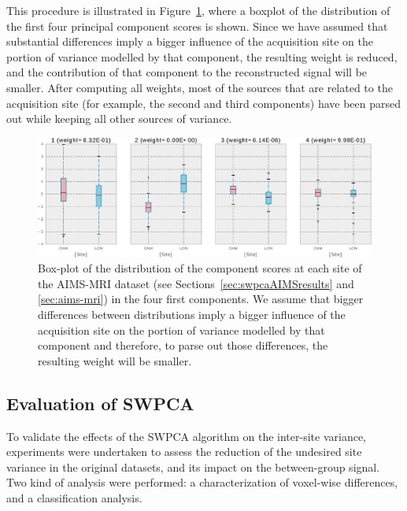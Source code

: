 This procedure is illustrated in Figure~\ref{fig:swpcaboxplot}, where a boxplot of the distribution of the first four principal component scores is shown. Since we have assumed that substantial differences imply a bigger influence of the acquisition site on the portion of variance modelled by that component, the resulting weight is reduced, and the contribution of that component to the reconstructed signal will be smaller. After computing all weights, most of the sources that are related to the acquisition site (for example, the second and third components) have been parsed out while keeping all other sources of variance.

\begin{figure}
	\centering
	\includegraphics[width=\linewidth]{Graphics/ch7/FIGURE02}
	\caption[Box-plot of the distribution of the component scores at each site of the AIMS-MRI dataset (see Sections~\ref{sec:swpcaAIMSresults} and \ref{sec:aims-mri}) in the four first components.]{Box-plot of the distribution of the component scores at each site of the AIMS-MRI dataset (see Sections~\ref{sec:swpcaAIMSresults} and \ref{sec:aims-mri}) in the four first components. We assume that bigger differences between distributions imply a bigger influence of the acquisition site on the portion of variance modelled by that component and therefore, to parse out those differences, the resulting weight will be smaller.}
	\label{fig:swpcaboxplot}
\end{figure}

\subsection{Evaluation of \acs{SWPCA}}\label{sec:swpcaEval}
To validate the effects of the \ac{SWPCA} algorithm on the inter-site variance, experiments were undertaken to assess the reduction of the undesired site variance in the original datasets, and its impact on the between-group signal. Two kind of analysis were performed: a characterization of voxel-wise differences, and a classification analysis. 

